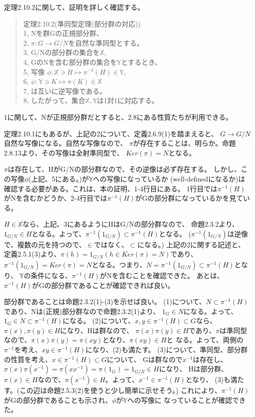 \documentclass{jsarticle}
\begin{document}
定理2.10.2に関して、証明を詳しく確認する。

\begin{quote}
定理2.10.2(準同型定理(部分群の対応))\\
1, Nを群Gの正規部分群、\\
2, $\pi : G \rightarrow G/N$を自然な準同型とする。\\
3, G/Nの部分群の集合を$\mathbb{X}$,\\ 
4, GのNを含む部分群の集合を$\mathbb{Y}$とするとき、\\
5, 写像
$\phi : \mathbb{X} \ni H \mapsto \pi^{-1}(H) \in \mathbb{Y}$, \\
6, $\psi : \mathbb{Y} \ni K \mapsto \pi(K) \in \mathbb{X}$\\
7, は互いに逆写像である。\\
8, したがって、集合$\mathbb{X}, \mathbb{Y}$は1対1に対応する。
\end{quote}

1に関して、Nが正規部分群だとすると、2.8にある性質たちが利用できる。

定理2.10.1にもあるが、上記の2について、定義2.6.9(1)を踏まえると、
$G \rightarrow G/N$自然な写像になる。自然な写像なので、
$\pi$が存在することは、明らか。命題2.8.13より、その写像は全射準同型で、
$Ker(\pi) = N$となる。

$\pi$は存在して、HがG/Nの部分群なので、その逆像は必ず存在する。
しかし、この写像$\phi$(上記、5にある。)が$\mathbb{Y}$への写像になっているか
(well-definedになるか)は確認する必要がある。これは、本の証明、1-4行目にある。
1行目では$\pi^{-1}(H)$がNを含むかどうか、2-4行目では$\pi^{-1}(H)$がGの部分群になっているかを見ている。

$H \in \mathbb{X}$なら、上記、3にあるようにHはG/Nの部分群なので、
命題2.3.2より、$1_{G/N} \in H$となる。よって、$\pi^{-1}(1_{G/N}) \subset \pi^{-1}(H)$となる。
($\pi^{-1}(1_{G/N})$は逆像で、複数の元を持つので、$\in$ではなく、$\subset$になる。)
上記の2に関する記述と、定義2.5.1(3)より、$\pi(h) = 1_{G/N}(h \in Ker(\pi) = N)$であり、
$\pi^{-1}(1_{G/N}) = Ker(\pi) = N$となる。つまり、$N = \pi^{-1}(1_{G/N}) \subset \pi^{-1}(H)$となり、
$\mathbb{Y}$の条件になる、$\pi^{-1}(H)$がNを含むことを確認できた。
あとは、$\pi^{-1}(H)$がGの部分群であることが確認できれば良い。

部分群であることは命題2.3.2(1)-(3)を示せば良い。
(1)について、$N \subset \pi^{-1}(H)$であり、Nは(正規)部分群なので命題2.3.2(1)より、
$1_G \in N$になる。よって、$1_G \in N \subset \pi^{-1}(H)$になる。
(2)について、$x,y \in \pi^{-1}(H) \subset G$なら、$\pi(x), \pi(y) \in H$になり、Hは群なので、
$\pi(x)\pi(y) \in H$であり、$\pi$は準同型なので、$\pi(x)\pi(y) = \pi(xy)$となり、$\pi(xy) \in H$と
なる。よって、両側の$\pi^{-1}$を考え、$xy \in \pi^{-1}(H)$になり、(2)も満たす。
(3)について、準同型、部分群の性質を考え、$x \in \pi^{-1}(H) \subset G$について、
Gは群なので$x^{-1}$は存在し、$\pi(x)\pi(x^{-1}) = \pi(xx^{-1}) = \pi(1_G) = 1_{G/N} \in H$になり、
Hは部分群、$\pi(x) \in H$なので、$\pi(x^{-1}) \in H$。よって、$x^{-1} \in \pi^{-1}(H)$となり、
(3)も満たす。(この辺は命題2.5.3(2)を使うと少し簡単に示せそう。)
これにより、$\pi^{-1}(H)$がGの部分群であることも示され、$\phi$が$\mathbb{Y}$への写像に
なっていることが確認できた。
\end{document}
